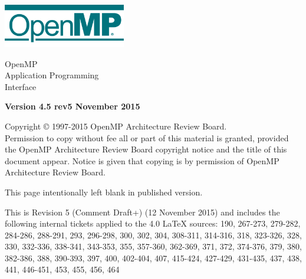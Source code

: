 
  \begin{titlepage}
    \begin{flushleft}
     \hspace{-6em} \includegraphics[width=0.4\textwidth]{openmp-logo.png}
    \end{flushleft}

    \begin{adjustwidth}{-0.75in}{0in}
    \begin{center}
      \Huge
      \textsf{OpenMP\\Application Programming\\Interface}

      \vspace{0.5in}\textsf{    }\vspace{-0.7in}
      \normalsize

      \vspace{1.0in}

      \textbf{Version 4.5 rev5 November 2015}
    \end{center}
    \end{adjustwidth}

    \vspace{3.0in}

\begin{adjustwidth}{0pt}{1em}\setlength{\parskip}{0.25\baselineskip}%
Copyright © 1997-2015 OpenMP Architecture Review Board.\\
Permission to copy without fee all or part of this material is granted,
provided the OpenMP Architecture Review Board copyright notice and
the title of this document appear. Notice is given that copying is by
permission of OpenMP Architecture Review Board.\end{adjustwidth}

  \end{titlepage}


\clearpage
\thispagestyle{empty}
\phantom{a}
This page intentionally left blank in published version.

This is Revision 5 (Comment Draft+) (12 November 2015) and includes the 
following internal tickets applied to the 4.0 LaTeX sources: 
190, 267-273, 279-282, 284-286, 288-291, 293, 296-298, 300, 302, 304, 308-311, 
314-316, 318, 323-326, 328, 330, 332-336, 338-341, 343-353, 355, 357-360, 
362-369, 371, 372, 374-376, 379, 380, 382-386, 388, 390-393, 397, 400,
402-404, 407, 415-424, 427-429, 431-435, 437, 438, 441, 446-451, 453,
455, 456, 464


\vfill

